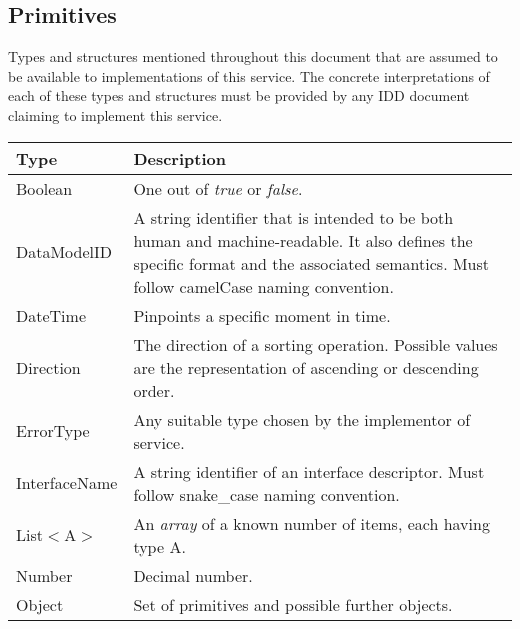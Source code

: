 \documentclass[a4paper]{arrowhead}
\newcommand{\pdef}[1]{{\textcolor{ArrowheadGrey}{#1\label{sec:model:primitives:#1}\label{sec:model:primitives:#1s}\label{sec:model:primitives:#1es}}}}
\begin{document}
\subsection{Primitives}
\label{sec:model:primitives}

Types and structures mentioned throughout this document that are assumed to be available to implementations of this service.
The concrete interpretations of each of these types and structures must be provided by any IDD document claiming to implement this service.

\begin{table}[ht!]
\begin{tabularx}{\textwidth}{| p{5cm} | X |} \hline
\rowcolor{gray!33} Type & Description \\ \hline
\pdef{Boolean} & One out of \textit{true} or \textit{false}. \\ \hline
\pdef{DataModelID} & A string identifier that is intended to be both human and machine-readable. It also defines the specific format and the associated semantics. Must follow camelCase naming convention. \\ \hline
\pdef{DateTime}         & Pinpoints a specific moment in time. \\ \hline
\pdef{Direction}        & The direction of a sorting operation. Possible values are the representation of ascending or descending order. \\ \hline
\pdef{ErrorType}        & Any suitable type chosen by the implementor of service. \\ \hline
\pdef{InterfaceName}    & A string identifier of an interface descriptor. Must follow snake\_case naming convention. \\ \hline
\pdef{List}$<$A$>$      & An \textit{array} of a known number of items, each having type A. \\ \hline
\pdef{Number}           & Decimal number. \\ \hline
\pdef{Object}           & Set of primitives and possible further objects. \\ \hline
\end{tabularx}
\end{table}
\end{document}
